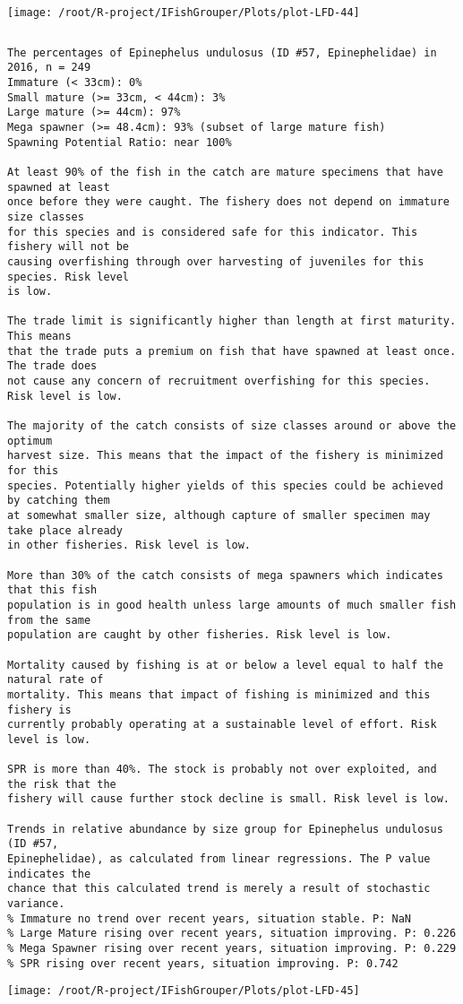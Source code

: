 \documentclass{report}\usepackage[]{graphicx}\usepackage[]{color}
\makeatletter
\def\maxwidth{ %
  \ifdim\Gin@nat@width>\linewidth
    \linewidth
  \else
    \Gin@nat@width
  \fi
}
\newenvironment{kframe}{%
 \def\at@end@of@kframe{}%
 \ifinner\ifhmode%
  \def\at@end@of@kframe{\end{minipage}}%
  \begin{minipage}{\columnwidth}%
 \fi\fi%
 \def\FrameCommand##1{\hskip\@totalleftmargin \hskip-\fboxsep
 \colorbox{shadecolor}{##1}\hskip-\fboxsep
     \hskip-\linewidth \hskip-\@totalleftmargin \hskip\columnwidth}%
 \MakeFramed {\advance\hsize-\width
   \@totalleftmargin\z@ \linewidth\hsize
   \@setminipage}}%
 {\par\unskip\endMakeFramed%
 \at@end@of@kframe}
\newenvironment{knitrout}{}{} %
\makeatother
\begin{document}
\begin{knitrout}
\texttt{[image: /root/R-project/IFishGrouper/Plots/plot-LFD-44]} 
\begin{kframe}\begin{verbatim}
\end{verbatim}
\end{kframe}
\clearpage
\newpage
\begin{kframe}\begin{verbatim}The percentages of Epinephelus undulosus (ID #57, Epinephelidae) in 2016, n = 249
Immature (< 33cm): 0%
Small mature (>= 33cm, < 44cm): 3%
Large mature (>= 44cm): 97%
Mega spawner (>= 48.4cm): 93% (subset of large mature fish)
Spawning Potential Ratio: near 100%
 
At least 90% of the fish in the catch are mature specimens that have spawned at least
once before they were caught. The fishery does not depend on immature size classes
for this species and is considered safe for this indicator. This fishery will not be
causing overfishing through over harvesting of juveniles for this species. Risk level
is low.

The trade limit is significantly higher than length at first maturity.  This means
that the trade puts a premium on fish that have spawned at least once. The trade does
not cause any concern of recruitment overfishing for this species. Risk level is low.

The majority of the catch consists of size classes around or above the optimum
harvest size. This means that the impact of the fishery is minimized for this
species. Potentially higher yields of this species could be achieved by catching them
at somewhat smaller size, although capture of smaller specimen may take place already
in other fisheries. Risk level is low.

More than 30% of the catch consists of mega spawners which indicates that this fish
population is in good health unless large amounts of much smaller fish from the same
population are caught by other fisheries. Risk level is low.
 
Mortality caused by fishing is at or below a level equal to half the natural rate of
mortality. This means that impact of fishing is minimized and this fishery is
currently probably operating at a sustainable level of effort. Risk level is low.
 
SPR is more than 40%. The stock is probably not over exploited, and the risk that the
fishery will cause further stock decline is small. Risk level is low.
 
Trends in relative abundance by size group for Epinephelus undulosus (ID #57,
Epinephelidae), as calculated from linear regressions. The P value indicates the
chance that this calculated trend is merely a result of stochastic variance.
% Immature no trend over recent years, situation stable. P: NaN
% Large Mature rising over recent years, situation improving. P: 0.226
% Mega Spawner rising over recent years, situation improving. P: 0.229
% SPR rising over recent years, situation improving. P: 0.742
\end{verbatim}
\end{kframe}
\texttt{[image: /root/R-project/IFishGrouper/Plots/plot-LFD-45]} 


\end{knitrout}
\end{document}
